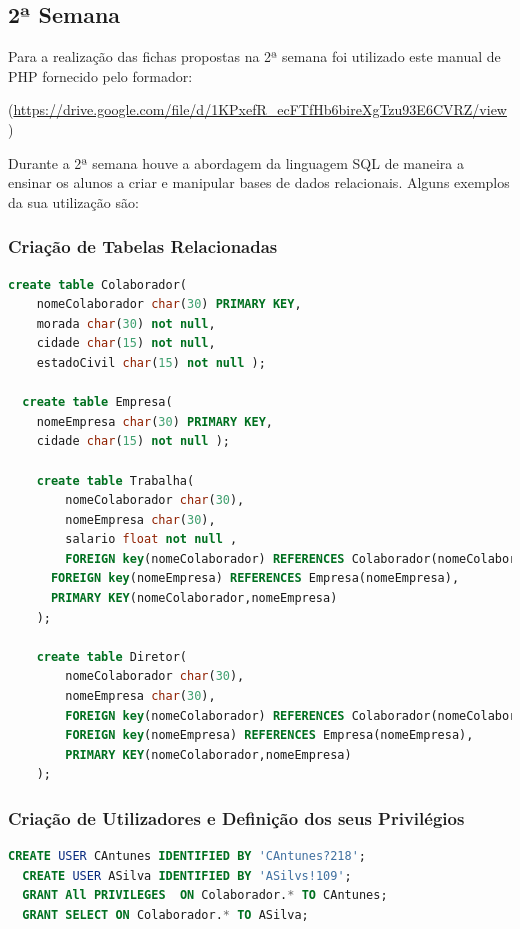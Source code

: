\documentclass[14pt]{article}
\begin{document}
\subsection{2ª Semana}

Para a realização das fichas propostas na 2ª semana foi utilizado este manual de PHP fornecido pelo formador:

(\url{https://drive.google.com/file/d/1KPxefR_ecFTfHb6bireXgTzu93E6CVRZ/view})

Durante a 2ª semana houve a abordagem da linguagem SQL de maneira a ensinar os alunos a criar e manipular bases de dados relacionais.
Alguns exemplos da sua utilização são:

\subsubsection{Criação de Tabelas Relacionadas }

\begin{lstlisting}[language=SQL]
  create table Colaborador(
    nomeColaborador char(30) PRIMARY KEY,
    morada char(30) not null,
    cidade char(15) not null,
    estadoCivil char(15) not null );

  create table Empresa(
    nomeEmpresa char(30) PRIMARY KEY,
    cidade char(15) not null );

    create table Trabalha(
    	nomeColaborador char(30),
    	nomeEmpresa char(30),
    	salario float not null ,
    	FOREIGN key(nomeColaborador) REFERENCES Colaborador(nomeColaborador),
      FOREIGN key(nomeEmpresa) REFERENCES Empresa(nomeEmpresa),
      PRIMARY KEY(nomeColaborador,nomeEmpresa)
    );

    create table Diretor(
      	nomeColaborador char(30),
      	nomeEmpresa char(30),
      	FOREIGN key(nomeColaborador) REFERENCES Colaborador(nomeColaborador),
        FOREIGN key(nomeEmpresa) REFERENCES Empresa(nomeEmpresa),
        PRIMARY KEY(nomeColaborador,nomeEmpresa)
    );

\end{lstlisting}
\newpage
\subsubsection{Criação de Utilizadores e Definição dos seus Privilégios}

\begin{lstlisting}[language=SQL]
  CREATE USER CAntunes IDENTIFIED BY 'CAntunes?218';
  CREATE USER ASilva IDENTIFIED BY 'ASilvs!109';
  GRANT All PRIVILEGES  ON Colaborador.* TO CAntunes;
  GRANT SELECT ON Colaborador.* TO ASilva;
\end{lstlisting}
\end{document}
